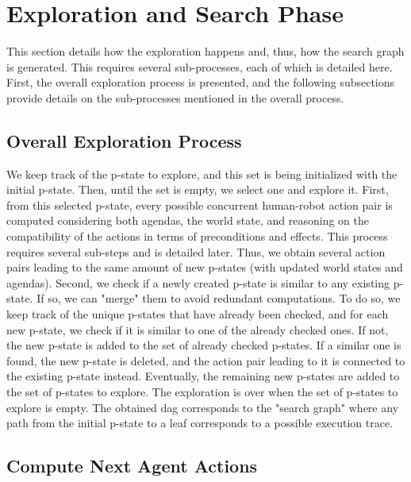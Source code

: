 \clearpage

\section{Exploration and Search Phase}

This section details how the exploration happens and, thus, how the search graph is generated. This requires several sub-processes, each of which is detailed here. First, the overall exploration process is presented, and the following subsections provide details on the sub-processes mentioned in the overall process.

    \subsection{Overall Exploration Process}

We keep track of the p-state to explore, and this set is being initialized with the initial p-state. Then, until the set is empty, we select one and explore it.
First, from this selected p-state, every possible concurrent human-robot action pair is computed considering both agendas, the world state, and reasoning on the compatibility of the actions in terms of preconditions and effects. This process requires several sub-steps and is detailed later. Thus, we obtain several action pairs leading to the same amount of new p-states (with updated world states and agendas).
Second, we check if a newly created p-state is similar to any existing p-state. If so, we can "merge" them to avoid redundant computations. To do so, we keep track of the unique p-states that have already been checked, and for each new p-state, we check if it is similar to one of the already checked ones. 
If not, the new p-state is added to the set of already checked p-states. 
If a similar one is found, the new p-state is deleted, and the action pair leading to it is connected to the existing p-state instead.
Eventually, the remaining new p-states are added to the set of p-states to explore. 
The exploration is over when the set of p-states to explore is empty. The obtained \acrshort{dag} corresponds to the "search graph" where any path from the initial p-state to a leaf corresponds to a possible execution trace.

    \subsection{Compute Next Agent Actions}

